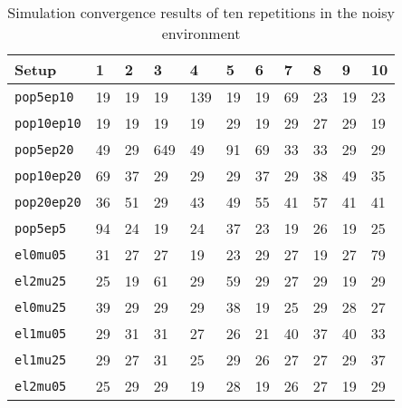 \begin{table}[h!]
	\centering
	\caption[Simulation convergence results in the noisy
	environment]{Simulation convergence results of ten repetitions in the noisy	environment}
	\label{tab:apx_conv_noise}
	\begin{tabular}{lllllllllll}
		\hline
		\textbf{Setup} & \textbf{1} & \textbf{2} & \textbf{3} & \textbf{4} & \textbf{5} & \textbf{6} & \textbf{7} & \textbf{8} & \textbf{9} & \textbf{10} \\\hline
		\texttt{pop5ep10} & 19 & 19 & 19 & 139 & 19 & 19 & 69 & 23 & 19 & 23 \\
		\texttt{pop10ep10} & 19 & 19 & 19 & 19 & 29 & 19 & 29 & 27 & 29 & 19 \\
		\texttt{pop5ep20} & 49 & 29 & 649 & 49 & 91 & 69 & 33 & 33 & 29 & 29 \\
		\texttt{pop10ep20} & 69 & 37 & 29 & 29 & 29 & 37 & 29 & 38 & 49 & 35 \\
		\texttt{pop20ep20} & 36 & 51 & 29 & 43 & 49 & 55 & 41 & 57 & 41 & 41 \\
		\texttt{pop5ep5} & 94 & 24 & 19 & 24 & 37 & 23 & 19 & 26 & 19 & 25 \\
		\texttt{el0mu05} & 31 & 27 & 27 & 19 & 23 & 29 & 27 & 19 & 27 & 79 \\
		\texttt{el2mu25} & 25 & 19 & 61 & 29 & 59 & 29 & 27 & 29 & 19 & 29 \\
		\texttt{el0mu25} & 39 & 29 & 29 & 29 & 38 & 19 & 25 & 29 & 28 & 27 \\
		\texttt{el1mu05} & 29 & 31 & 31 & 27 & 26 & 21 & 40 & 37 & 40 & 33 \\
		\texttt{el1mu25} & 29 & 27 & 31 & 25 & 29 & 26 & 27 & 27 & 29 & 37 \\
		\texttt{el2mu05} & 25 & 29 & 29 & 19 & 28 & 19 & 26 & 27 & 19 & 29 \\
	\end{tabular}
\end{table}
